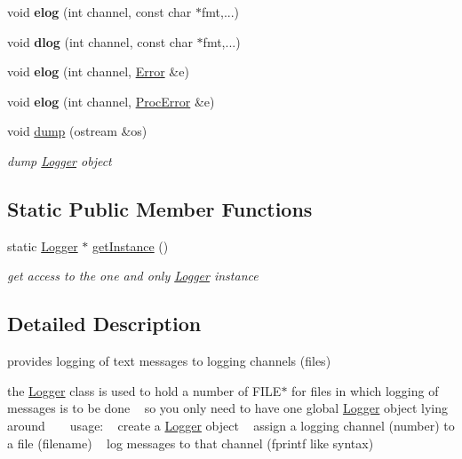 \begin{DoxyCompactItemize}
void {\bfseries elog} (int channel, const char $\ast$fmt,...)
\item 
\mbox{\label{classLogger_a33ee464177bc7939cca0ae3ee28985d6}} 
void {\bfseries dlog} (int channel, const char $\ast$fmt,...)
\item 
\mbox{\label{classLogger_a44533b6fdd9f1f0d7730d77449e87985}} 
void {\bfseries elog} (int channel, \hyperlink{classError}{Error} \&e)
\item 
\mbox{\label{classLogger_a4477567175a3d8eb76130faf42ec865d}} 
void {\bfseries elog} (int channel, \hyperlink{classProcError}{Proc\+Error} \&e)
\item 
\mbox{\label{classLogger_afad2d6ca4c0725fa66e8d61e741d5776}} 
void \hyperlink{classLogger_afad2d6ca4c0725fa66e8d61e741d5776}{dump} (ostream \&os)
\begin{DoxyCompactList}\small\item\em dump \hyperlink{classLogger}{Logger} object \end{DoxyCompactList}\end{DoxyCompactItemize}
\subsection*{Static Public Member Functions}
\begin{DoxyCompactItemize}
\item 
\mbox{\label{classLogger_afec28ae6d7bdf8f6a0734cb20756de10}} 
static \hyperlink{classLogger}{Logger} $\ast$ \hyperlink{classLogger_afec28ae6d7bdf8f6a0734cb20756de10}{get\+Instance} ()
\begin{DoxyCompactList}\small\item\em get access to the one and only \hyperlink{classLogger}{Logger} instance \end{DoxyCompactList}\end{DoxyCompactItemize}


\subsection{Detailed Description}
provides logging of text messages to logging channels (files) 

the \hyperlink{classLogger}{Logger} class is used to hold a number of F\+I\+L\+E$\ast$ for files in which logging of messages is to be done ~\newline
so you only need to have one global \hyperlink{classLogger}{Logger} object lying around ~\newline
~\newline
usage\+: ~\newline
create a \hyperlink{classLogger}{Logger} object ~\newline
assign a logging channel (number) to a file (filename) ~\newline
log messages to that channel (fprintf like syntax) 


